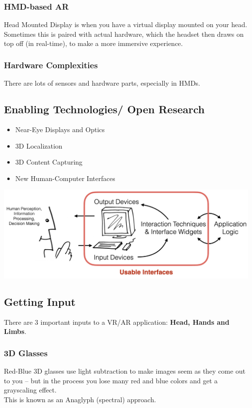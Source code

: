 \subsubsection{HMD-based AR}
Head Mounted Display is when you have a virtual display mounted on your head. Sometimes this is paired with actual hardware, which the headset then draws on top off (in real-time), to make a more immersive experience.

\subsubsection{Hardware Complexities}
There are lots of sensors and hardware parts, especially in HMDs.

\subsection{Enabling Technologies/
Open Research}
\begin{itemize}
    \item Near-Eye Displays and Optics
    \item 3D Localization
    \item 3D Content Capturing
    \item New Human-Computer Interfaces
\end{itemize}
\begin{center}
    \includegraphics[scale=0.4]{lectures/wk13/img/info_proc_circled.png}
\end{center}

\subsection{Getting Input}
There are 3 important inputs to a VR/AR application: \textbf{Head, Hands and Limbs}.

\subsubsection{3D Glasses}
Red-Blue 3D glasses use light subtraction to make images seem as they come out to you -- but in the process you lose many red and blue colors and get a grayscaling effect.\\
This is known as an Anaglyph (spectral) approach.

